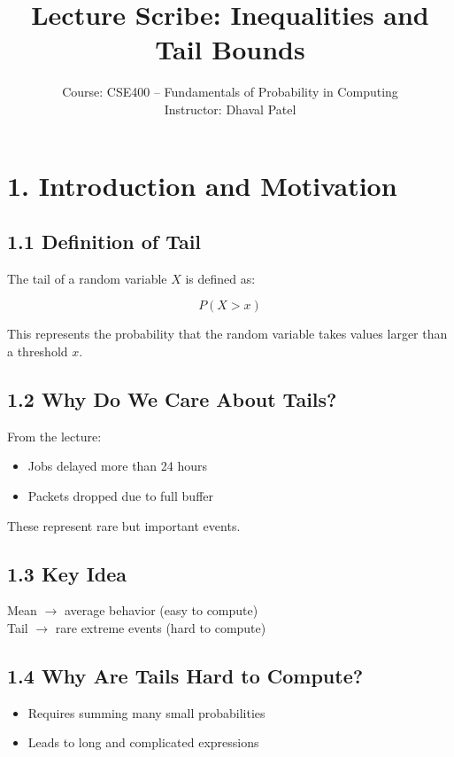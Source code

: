 \documentclass[12pt]{article}
\begin{document}
\title{Lecture Scribe: Inequalities and Tail Bounds}
\author{Course: CSE400 – Fundamentals of Probability in Computing \\ Instructor: Dhaval Patel}
\date{}
\maketitle

\section*{1. Introduction and Motivation}

\subsection*{1.1 Definition of Tail}

The tail of a random variable $X$ is defined as:

\[
P(X > x)
\]

This represents the probability that the random variable takes values larger than a threshold $x$.

\subsection*{1.2 Why Do We Care About Tails?}

From the lecture:

\begin{itemize}
\item Jobs delayed more than 24 hours
\item Packets dropped due to full buffer
\end{itemize}

These represent rare but important events.

\subsection*{1.3 Key Idea}

Mean $\rightarrow$ average behavior (easy to compute) \\
Tail $\rightarrow$ rare extreme events (hard to compute)

\subsection*{1.4 Why Are Tails Hard to Compute?}

\begin{itemize}
\item Requires summing many small probabilities
\item Leads to long and complicated expressions
\end{itemize}
\end{document}
